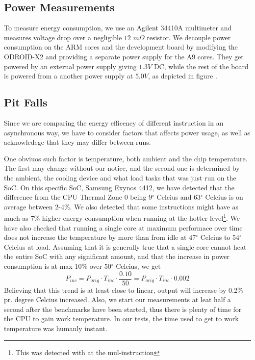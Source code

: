 \subsection{Power Measurements} To measure energy consumption, we use an Agilent
34410A multimeter and measures voltage drop over a negligible $12$ $m\Omega$
resistor. We decouple power consumption on the ARM cores and the development
board by modifying the ODROID-X2 and providing a separate power supply for the
A9 cores. They get powered by an external power supply giving $1.3V$ DC, while
the rest of the board is powered from a another power supply at $5.0V$, as
depicted in figure .

\subsection{Pit Falls}
Since we are comparing the energy efficency of different instruction in an
asynchronous way, we have to consider factors that affects power usage, as well
as acknowledege that they may differ between runs.

One obviuos such factor is temperature, both ambient and the chip temperature.
The first may change without our notice, and the second one is determined by the
ambient, the cooling device and what load tasks that was just run on the SoC. On
this specific SoC, Samsung Exynos 4412, we have detected that the difference
from the CPU Thermal Zone 0 being 9$^\circ$ Celcius and 63$^\circ$ Celcius is on
average between 2-4\%. We also detected that some instructions might have as
much as 7\% higher energy consumption when running at the hotter
level\footnote{This was detected with at the {\ttfamily mul}-instruction}. We
have also checked that running a single core at maximum performace over time
does not increase the temperature by more than from idle at 47$^\circ$ Celcius
to 54$^\circ$ Celcius at load. Assuming that it is generally true that a single
core cannot heat the entire SoC with any significant amount, and that the
increase in power consumption is at max 10\% over 50$^\circ$ Celcius, we get
\begin{equation} P_{inc} = P_{orig} \cdot T_{inc} \cdot \frac{0.10}{50} =
    P_{orig} \cdot T_{inc} \cdot 0.002 \end{equation} Believing that this trend
is at least close to linear, output will increase by 0.2\% pr.  degree Celcius
increased. Also, we start our measurements at leat half a second after the
benchmarks have been started, thus there is plenty of time for the CPU to gain
work temperature. In our tests, the time used to get to work temperature was
humanly instant.

